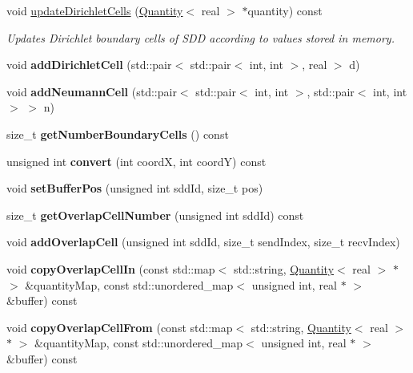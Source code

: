\begin{DoxyCompactItemize}
void \mbox{\hyperlink{classSDShared_a0c83e8c7a830c2febcfc944f57fe158b}{update\+Dirichlet\+Cells}} (\mbox{\hyperlink{classQuantity}{Quantity}}$<$ real $>$ $\ast$quantity) const
\begin{DoxyCompactList}\small\item\em Updates Dirichlet boundary cells of S\+DD according to values stored in memory. \end{DoxyCompactList}\item 
\mbox{\label{classSDShared_aa670f9d64ac7c03f9964ee0caa26f74c}} 
void {\bfseries add\+Dirichlet\+Cell} (std\+::pair$<$ std\+::pair$<$ int, int $>$, real $>$ d)
\item 
\mbox{\label{classSDShared_a5e5af3b277896ecbbca23d5df0c23b97}} 
void {\bfseries add\+Neumann\+Cell} (std\+::pair$<$ std\+::pair$<$ int, int $>$, std\+::pair$<$ int, int $>$ $>$ n)
\item 
\mbox{\label{classSDShared_a3bab738ad8c008e621b40505f3db145c}} 
size\+\_\+t {\bfseries get\+Number\+Boundary\+Cells} () const
\item 
\mbox{\label{classSDShared_a8a7b516e808d3a4781f94d9a50763e2c}} 
unsigned int {\bfseries convert} (int coordX, int coordY) const
\item 
\mbox{\label{classSDShared_a7f6a437419391d952839262b57e29161}} 
void {\bfseries set\+Buffer\+Pos} (unsigned int sdd\+Id, size\+\_\+t pos)
\item 
\mbox{\label{classSDShared_aa1b518a2b0779864a5156dde19dd4911}} 
size\+\_\+t {\bfseries get\+Overlap\+Cell\+Number} (unsigned int sdd\+Id) const
\item 
\mbox{\label{classSDShared_a5f7996970b7ce7a65b5fdf224ee8f6f3}} 
void {\bfseries add\+Overlap\+Cell} (unsigned int sdd\+Id, size\+\_\+t send\+Index, size\+\_\+t recv\+Index)
\item 
\mbox{\label{classSDShared_a304e9ff7e7a4b612ad75b3770bfc634b}} 
void {\bfseries copy\+Overlap\+Cell\+In} (const std\+::map$<$ std\+::string, \mbox{\hyperlink{classQuantity}{Quantity}}$<$ real $>$ $\ast$ $>$ \&quantity\+Map, const std\+::unordered\+\_\+map$<$ unsigned int, real $\ast$ $>$ \&buffer) const
\item 
\mbox{\label{classSDShared_a3038fcccd20d251e4fbe98e31b89faf6}} 
void {\bfseries copy\+Overlap\+Cell\+From} (const std\+::map$<$ std\+::string, \mbox{\hyperlink{classQuantity}{Quantity}}$<$ real $>$ $\ast$ $>$ \&quantity\+Map, const std\+::unordered\+\_\+map$<$ unsigned int, real $\ast$ $>$ \&buffer) const
\end{DoxyCompactItemize}


